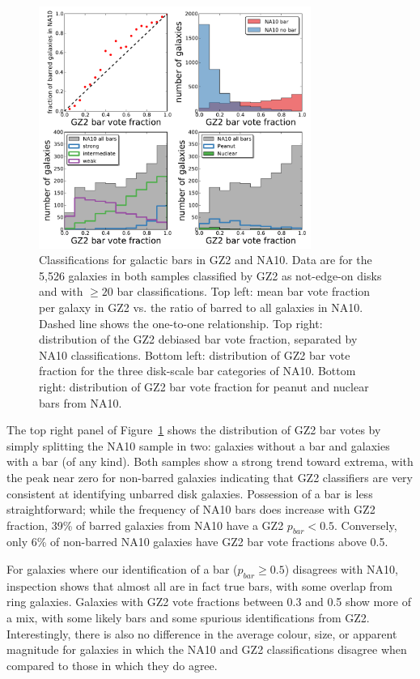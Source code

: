 \documentclass[useAMS,usenatbib]{mn2e}
\providecommand{\DIFaddtex}[1]{{\protect\color{blue}\uwave{#1}}} %
\providecommand{\DIFdeltex}[1]{{\protect\color{red}\sout{#1}}}                      %
\providecommand{\DIFaddbegin}{} %
\providecommand{\DIFaddend}{} %
\providecommand{\DIFdelbegin}{} %
\providecommand{\DIFdelend}{} %
\providecommand{\DIFadd}[1]{\texorpdfstring{\DIFaddtex{#1}}{#1}} %
\providecommand{\DIFdel}[1]{\texorpdfstring{\DIFdeltex{#1}}{}} %
\begin{document}
\begin{figure}
\includegraphics[angle=0,width=3.5in]{figures/na_bars.pdf}
\caption{Classifications for galactic bars in GZ2 and NA10. Data are for the 5,526 galaxies in both samples classified by GZ2 as not-edge-on disks and with $\geq20$ bar classifications. Top left: mean bar vote fraction per galaxy in GZ2 vs. the ratio of barred to all galaxies in NA10. Dashed line shows the one-to-one relationship. Top right: distribution of the GZ2 debiased bar vote fraction, separated by NA10 classifications. Bottom left: distribution of GZ2 bar vote fraction for the three disk-scale bar categories of NA10. Bottom right: distribution of GZ2 bar vote fraction for peanut and nuclear bars from NA10. 
\label{fig-na_bars}}
\end{figure}

The top right panel of Figure~\ref{fig-na_bars} shows the distribution of GZ2 bar votes by simply splitting the NA10 sample in two: galaxies without a bar and galaxies with a bar (of any kind). Both samples show a strong trend toward extrema, with the peak near zero for non-barred galaxies indicating that GZ2 classifiers are very consistent at identifying unbarred disk galaxies. Possession of a bar is less straightforward; while the frequency of NA10 bars does increase with GZ2 fraction, 39\% of barred galaxies from NA10 have a GZ2 \DIFdelbegin \DIFdel{$p_{bar}<0.5$}\DIFdelend \DIFaddbegin \DIFadd{$p_\mathrm{bar}<0.5$}\DIFaddend . Conversely, only 6\% of non-barred NA10 galaxies have GZ2 bar vote fractions above 0.5. 

For galaxies where our identification of a bar (\DIFdelbegin \DIFdel{$p_{bar}\geq0.5$}\DIFdelend \DIFaddbegin \DIFadd{$p_\mathrm{bar}\geq0.5$}\DIFaddend ) disagrees with NA10, inspection shows that almost all are in fact true bars, with some overlap from ring galaxies. Galaxies with GZ2 vote fractions between 0.3 and 0.5 show more of a mix, with some likely bars and some spurious identifications from GZ2. Interestingly, there is also no difference in the average colour, size, or apparent magnitude for galaxies in which the NA10 and GZ2 classifications disagree when compared to those in which they do agree. 
\end{document}
